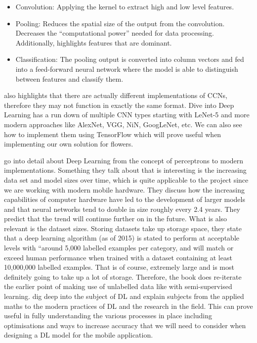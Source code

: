 \documentclass[12pt,a4paper]{report}
\begin{document}
\begin{itemize}
    \item Convolution: Applying the kernel to extract high and low level features.
    \item Pooling: Reduces the spatial size of the output from the convolution. Decreases the “computational power” 
    needed for data processing. Additionally, highlights features that are dominant.
    \item Classification: The pooling output is converted into column vectors and fed into a feed-forward neural 
    network where the model is able to distinguish between features and classify them.
\end{itemize}

\citet{saha2018} also highlights that there are actually different implementations of CCNs, therefore they may not function 
in exactly the same format. Dive into Deep Learning \citep{diveintodeeplearning} has a run down of multiple CNN types 
starting with LeNet-5 and more modern approaches like AlexNet, VGG, NiN, GoogLeNet, etc. We can also see how to 
implement them using TensorFlow which will prove useful when implementing our own solution for flowers.

\citet{goodfellow2016deep} go into detail about Deep Learning from the concept of perceptrons to modern 
implementations. Something they talk about that is interesting is the increasing data set and model sizes over time, 
which is quite applicable to the project since we are working with modern mobile hardware. They discuss how the 
increasing capabilities of computer hardware have led to the development of larger models and that neural networks tend 
to double in size roughly every 2.4 years. They predict that the trend will continue further on in the future. What is 
also relevant is the dataset sizes. Storing datasets take up storage space, they state that a deep learning algorithm 
(as of 2015) is stated to perform at acceptable levels with “around 5,000 labelled examples per category, and will match
or exceed human performance when trained with a dataset containing at least 10,000,000 labelled examples. That is of 
course, extremely large and is most definitely going to take up a lot of storage. Therefore, the book does re-iterate 
the earlier point of making use of unlabelled data like with semi-supervised learning. \citet{goodfellow2016deep} dig deep into the subject of DL and explain subjects from the applied maths to the modern practices of DL and 
the research in the field. This can prove useful in fully understanding the various processes in place including 
optimisations and ways to increase accuracy that we will need to consider when designing a DL model for the mobile 
application.
\end{document}

